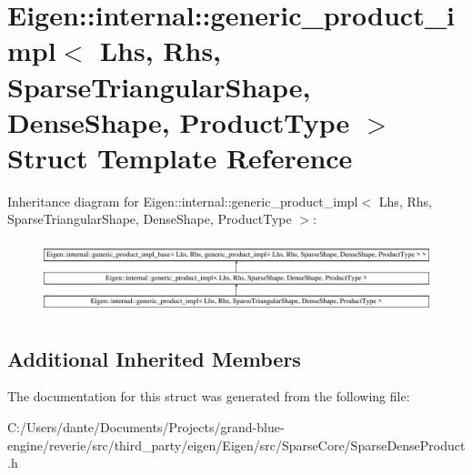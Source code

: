 \hypertarget{struct_eigen_1_1internal_1_1generic__product__impl_3_01_lhs_00_01_rhs_00_01_sparse_triangular_she6f06f29bc806fe3ce6ddd06da00c291}{}\section{Eigen\+::internal\+::generic\+\_\+product\+\_\+impl$<$ Lhs, Rhs, Sparse\+Triangular\+Shape, Dense\+Shape, Product\+Type $>$ Struct Template Reference}
\label{struct_eigen_1_1internal_1_1generic__product__impl_3_01_lhs_00_01_rhs_00_01_sparse_triangular_she6f06f29bc806fe3ce6ddd06da00c291}
Inheritance diagram for Eigen\+::internal\+::generic\+\_\+product\+\_\+impl$<$ Lhs, Rhs, Sparse\+Triangular\+Shape, Dense\+Shape, Product\+Type $>$\+:\begin{figure}[H]
\begin{center}
\leavevmode
\includegraphics[height=2.131979cm]{struct_eigen_1_1internal_1_1generic__product__impl_3_01_lhs_00_01_rhs_00_01_sparse_triangular_she6f06f29bc806fe3ce6ddd06da00c291}
\end{center}
\end{figure}
\subsection*{Additional Inherited Members}


The documentation for this struct was generated from the following file\+:\begin{DoxyCompactItemize}
\item 
C\+:/\+Users/dante/\+Documents/\+Projects/grand-\/blue-\/engine/reverie/src/third\+\_\+party/eigen/\+Eigen/src/\+Sparse\+Core/Sparse\+Dense\+Product.\+h\end{DoxyCompactItemize}
